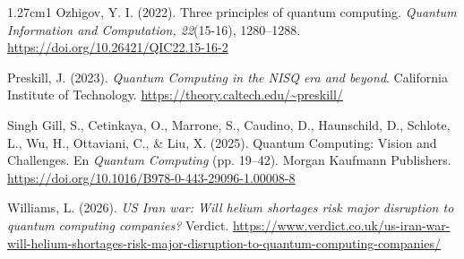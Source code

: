 \documentclass[12pt,a4paper]{article}
\begin{document}
\begin{hangparas}{1.27cm}{1}
Ozhigov, Y. I. (2022). Three principles of quantum computing. \textit{Quantum Information and Computation, 22}(15-16), 1280–1288. \url{https://doi.org/10.26421/QIC22.15-16-2}

Preskill, J. (2023). \textit{Quantum Computing in the NISQ era and beyond}. California Institute of Technology. \url{https://theory.caltech.edu/~preskill/}

Singh Gill, S., Cetinkaya, O., Marrone, S., Caudino, D., Haunschild, D., Schlote, L., Wu, H., Ottaviani, C., \& Liu, X. (2025). Quantum Computing: Vision and Challenges. En \textit{Quantum Computing} (pp. 19–42). Morgan Kaufmann Publishers. \url{https://doi.org/10.1016/B978-0-443-29096-1.00008-8}

Williams, L. (2026). \textit{US Iran war: Will helium shortages risk major disruption to quantum computing companies?} Verdict. \url{https://www.verdict.co.uk/us-iran-war-will-helium-shortages-risk-major-disruption-to-quantum-computing-companies/}

\end{hangparas}
\end{document}
